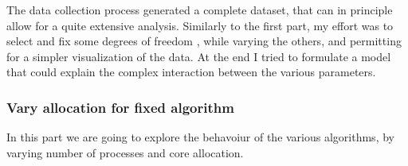 \documentclass{article}
\begin{document}
	The data collection process generated a complete dataset, that can in principle allow for a quite extensive analysis. Similarly to the first part, my effort was to select and fix some degrees of freedom , while varying the others, and permitting for a simpler visualization of the data.
	At the end I tried to formulate a model that could explain the complex interaction between the various parameters.
	
	\subsubsection{Vary allocation for fixed algorithm}
	
	In this part we are going to explore the behavoiur of the various algorithms, by varying number of processes and core allocation.
	
	
\end{document}
